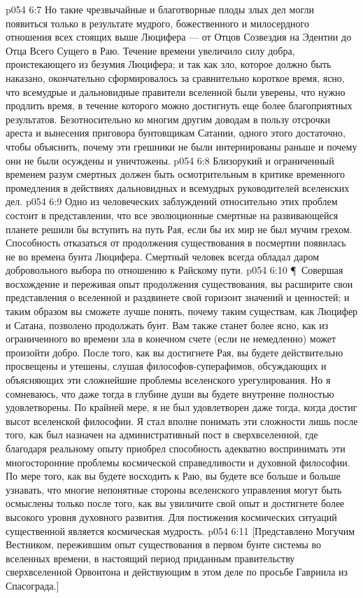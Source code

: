 \vs p054 6:7 Но такие чрезвычайные и благотворные плоды злых дел могли появиться только в результате мудрого, божественного и милосердного отношения всех стоящих выше Люцифера --- от Отцов Созвездия на Эдентии до Отца Всего Сущего в Раю. Течение времени увеличило силу добра, проистекающего из безумия Люцифера; и так как зло, которое должно быть наказано, окончательно сформировалось за сравнительно короткое время, ясно, что всемудрые и дальновидные правители вселенной были уверены, что нужно продлить время, в течение которого можно достигнуть еще более благоприятных результатов. Безотносительно ко многим другим доводам в пользу отсрочки ареста и вынесения приговора бунтовщикам Сатании, одного этого достаточно, чтобы объяснить, почему эти грешники не были интернированы раньше и почему они не были осуждены и уничтожены.
\vs p054 6:8 Близорукий и ограниченный временем разум смертных должен быть осмотрительным в критике временного промедления в действиях дальновидных и всемудрых руководителей вселенских дел.
\vs p054 6:9 Одно из человеческих заблуждений относительно этих проблем состоит в представлении, что все эволюционные смертные на развивающейся планете решили бы вступить на путь Рая, если бы их мир не был мучим грехом. Способность отказаться от продолжения существования в посмертии появилась не во времена бунта Люцифера. Смертный человек всегда обладал даром добровольного выбора по отношению к Райскому пути.
\vs p054 6:10 \P\ Совершая восхождение и переживая опыт продолжения существования, вы расширите свои представления о вселенной и раздвинете свой горизонт значений и ценностей; и таким образом вы сможете лучше понять, почему таким существам, как Люцифер и Сатана, позволено продолжать бунт. Вам также станет более ясно, как из ограниченного во времени зла в конечном счете (если не немедленно) может произойти добро. После того, как вы достигнете Рая, вы будете действительно просвещены и утешены, слушая философов\hyp{}суперафимов, обсуждающих и объясняющих эти сложнейшие проблемы вселенского урегулирования. Но я сомневаюсь, что даже тогда в глубине души вы будете внутренне полностью удовлетворены. По крайней мере, я не был удовлетворен даже тогда, когда достиг высот вселенской философии. Я стал вполне понимать эти сложности лишь после того, как был назначен на административный пост в сверхвселенной, где благодаря реальному опыту приобрел способность адекватно воспринимать эти многосторонние проблемы космической справедливости и духовной философии. По мере того, как вы будете восходить к Раю, вы будете все больше и больше узнавать, что многие непонятные стороны вселенского управления могут быть осмыслены только после того, как вы увиличите свой опыт и достигнете более высокого уровня духовного развития. Для постижения космических ситуаций существенной является космическая мудрость.
\vs p054 6:11 [Представлено Могучим Вестником, пережившим опыт существования в первом бунте системы во вселенных времени, в настоящий период приданным правительству сверхвселенной Орвонтона и действующим в этом деле по просьбе Гавриила из Спасограда.]
